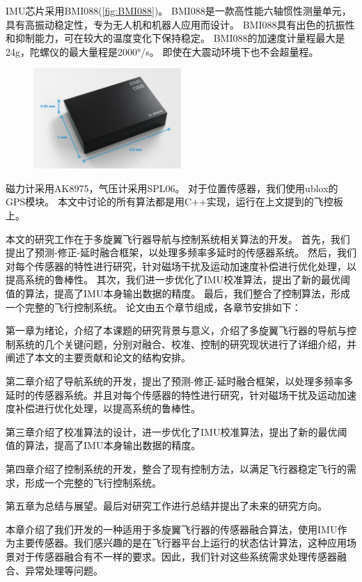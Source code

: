 \documentclass[
  type=master
]{gdutthesis}
\begin{document}
IMU芯片采用BMI088(\autoref{fig:BMI088})。
BMI088是一款高性能六轴惯性测量单元，具有高振动稳定性，专为无人机和机器人应用而设计。
BMI088具有出色的抗振性和抑制能力，可在较大的温度变化下保持稳定。
BMI088的加速度计量程最大是24g，陀螺仪的最大量程是2000°/s。
即使在大震动环境下也不会超量程。
\begin{figure}[htbp]
	\centering
	\includegraphics[width=0.5\textwidth]{屏幕截图 2022-03-30 151212.png}
	\label{fig:BMI088}
\end{figure}

磁力计采用AK8975，气压计采用SPL06。
对于位置传感器，我们使用ublox的GPS模块。
本文中讨论的所有算法都是用C++实现，运行在上文提到的飞控板上。

本文的研究工作在于多旋翼飞行器导航与控制系统相关算法的开发。
首先，我们提出了预测-修正-延时融合框架，以处理多频率多延时的传感器系统。
然后，我们对每个传感器的特性进行研究，针对磁场干扰及运动加速度补偿进行优化处理，以提高系统的鲁棒性。
其次，我们进一步优化了IMU校准算法，提出了新的最优阈值的算法，提高了IMU本身输出数据的精度。
最后，我们整合了控制算法，形成一个完整的飞行控制系统。
论文由五个章节组成，各章节安排如下：

第一章为绪论，介绍了本课题的研究背景与意义，介绍了多旋翼飞行器的导航与控制系统的几个关键问题，分别对融合、校准、控制的研究现状进行了详细介绍，并阐述了本文的主要贡献和论文的结构安排。

第二章介绍了导航系统的开发，提出了预测-修正-延时融合框架，以处理多频率多延时的传感器系统。并且对每个传感器的特性进行研究，针对磁场干扰及运动加速度补偿进行优化处理，以提高系统的鲁棒性。

第三章介绍了校准算法的设计，进一步优化了IMU校准算法，提出了新的最优阈值的算法，提高了IMU本身输出数据的精度。

第四章介绍了控制系统的开发，整合了现有控制方法，以满足飞行器稳定飞行的需求，形成一个完整的飞行控制系统。

第五章为总结与展望。最后对研究工作进行总结并提出了未来的研究方向。

本章介绍了我们开发的一种适用于多旋翼飞行器的传感器融合算法，使用IMU作为主要传感器。我们感兴趣的是在飞行器平台上运行的状态估计算法，这种应用场景对于传感器融合有不一样的要求。因此，我们针对这些系统需求处理传感器融合、异常处理等问题。
\end{document}
